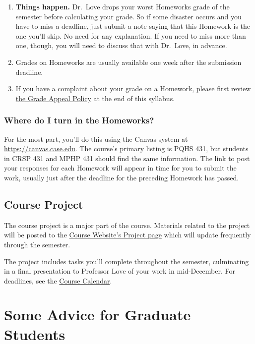 \documentclass[
]{book}
\begin{document}
\begin{enumerate}
\item
  \textbf{Things happen.} Dr.~Love drops your worst Homeworks grade of the semester before calculating your grade. So if some disaster occurs and you have to miss a deadline, just submit a note saying that this Homework is the one you'll skip. No need for any explanation. If you need to miss more than one, though, you will need to discuss that with Dr.~Love, in advance.
\item
  Grades on Homeworks are usually available one week after the submission deadline.
\item
  If you have a complaint about your grade on a Homework, please first review \protect\hyperlink{grade-appeal-policy---request-a-review-in-december}{the Grade Appeal Policy} at the end of this syllabus.
\end{enumerate}

\hypertarget{where-do-i-turn-in-the-homeworks}{%
\subsection{Where do I turn in the Homeworks?}\label{where-do-i-turn-in-the-homeworks}}

For the most part, you'll do this using the Canvas system at \url{https://canvas.case.edu}.
The course's primary listing is PQHS 431, but students in CRSP 431 and MPHP 431 should find the same information. The link to post your responses for each Homework will appear in time for you to submit the work, usually just after the deadline for the preceding Homework has passed.

\hypertarget{course-project}{%
\section{Course Project}\label{course-project}}

The course project is a major part of the course. Materials related to the project will be posted to the \href{https://github.com/THOMASELOVE/2019-431/tree/master/PROJECT}{Course Website's Project page} which will update frequently through the semester.

The project includes tasks you'll complete throughout the semester, culminating in a final presentation to Professor Love of your work in mid-December. For deadlines, see the \href{https://github.com/THOMASELOVE/2019-431/blob/master/calendar.md}{Course Calendar}.

\hypertarget{some-advice-for-graduate-students}{%
\chapter{Some Advice for Graduate Students}\label{some-advice-for-graduate-students}}
\end{document}
